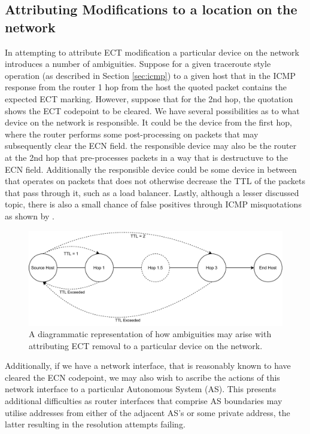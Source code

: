 \documentclass{l4proj}
\begin{document}


\subsection{Attributing Modifications to a location on the network}

In attempting to attribute ECT modification a particular device on the network introduces a number of ambiguities. Suppose for a given traceroute style operation (as described in Section \ref{sec:icmp}) to a given host that in the ICMP response from the router 1 hop from the host the quoted packet contains the expected ECT marking. However, suppose that for the 2nd hop, the quotation shows the ECT codepoint to be cleared. We have several possibilities as to what device on the network is responsible. It could be the device from the first hop, where the router performs some post-processing on packets that may subsequently clear the ECN field. the responsible device may also be the router at the 2nd hop that pre-processes packets in a way that is destructuve to the ECN field. Additionally the responsible device could be some device in between that operates on packets that does not otherwise decrease the TTL of the packets that pass through it, such as a load balancer. Lastly, although a lesser discussed topic, there is also a small chance of false positives through ICMP misquotations as shown by \cite{malone_analysis_2007}.

\begin{figure}[H]
\centering
\includegraphics[width=14cm,keepaspectratio]{dissertation/images/ambig_icmp.pdf}
\caption{A diagrammatic representation of how ambiguities may arise with attributing ECT removal to a particular device on the network.}
\label{fig:icmp}
\end{figure}

Additionally, if we have a network interface, that is reasonably known to have cleared the ECN codepoint, we may also wish to ascribe the actions of this network interface to a particular Autonomous System (AS). This presents additional difficulties as router interfaces that comprise AS boundaries may utilise addresses from either of the adjacent AS's or some private address, the latter resulting in the resolution attempts failing.
\end{document}
